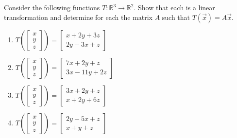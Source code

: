 \documentclass{ximera}
\begin{document}
\begin{problem}\label{prb:10.72} Consider the following functions $T:\mathbb{R}^{3}\rightarrow \mathbb{R}^{2}$.
Show that each is a linear transformation and determine for each the matrix $A$ such that
$T(\vec{x})=A\vec{x}$.

\begin{enumerate}
\item $T\left(\left[
\begin{array}{c}
x \\
y \\
z
\end{array}
\right]\right) =\left[
\begin{array}{c}
x+2y+3z \\
2y-3x+z
\end{array}
\right] $

\item $T\left(\left[
\begin{array}{c}
x \\
y \\
z
\end{array}
\right]\right) =\left[
\begin{array}{c}
7x+2y+z \\
3x-11y+2z
\end{array}
\right] $

\item $T\left(\left[
\begin{array}{c}
x \\
y \\
z
\end{array}
\right]\right) =\left[
\begin{array}{c}
3x+2y+z \\
x+2y+6z
\end{array}
\right] $

\item $T\left(\left[
\begin{array}{c}
x \\
y \\
z
\end{array}
\right]\right) =\left[
\begin{array}{c}
2y-5x+z \\
x+y+z
\end{array}
\right] $
\end{enumerate}
\end{problem}
\end{document}

